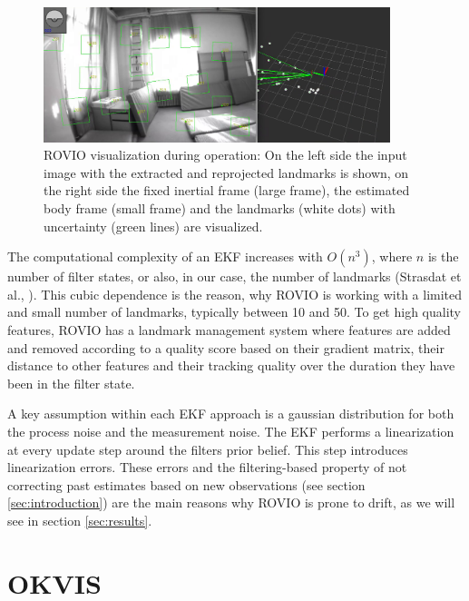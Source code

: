 \begin{figure}
   \centering
   \includegraphics[width=0.9\textwidth]{images/rovio_frontend.png}
   \caption{ROVIO visualization during operation: On the left side the input image with the extracted and reprojected landmarks is shown, on the right side the fixed inertial frame (large frame), the estimated body frame (small frame) and the landmarks (white dots) with uncertainty (green lines) are visualized.}
   \label{pics:rovio_frontend}
\end{figure}

The computational complexity of an EKF increases with $O(n^3)$, where $n$ is the number of filter states, or also, in our case, the number of landmarks (Strasdat et al., \cite{strasdat2010real}). This cubic dependence is the reason, why ROVIO is working with a limited and small number of landmarks, typically between 10 and 50. To get high quality features, ROVIO has a landmark management system where features are added and removed according to a quality score based on their gradient matrix, their distance to other features and their tracking quality over the duration they have been in the filter state. 

A key assumption within each EKF approach is a gaussian distribution for both the process noise and the measurement noise. The EKF performs a linearization at every update step around the filters prior belief. This step introduces linearization errors. These errors and the filtering-based property of not correcting past estimates based on new observations (see section \ref{sec:introduction}) are the main reasons why ROVIO is prone to drift, as we will see in section \ref{sec:results}.



\section{OKVIS}
\label{sec:okvis}

